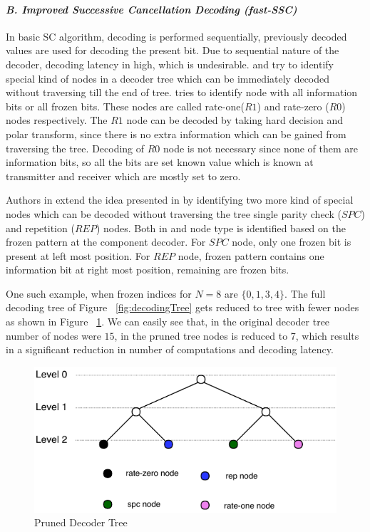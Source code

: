 
\paragraph{\emph{B. Improved Successive Cancellation Decoding (fast-SSC)}\newline}  \label{fastSSC} 
In basic SC algorithm, decoding is performed sequentially, previously decoded values are used for decoding the present bit. Due to sequential nature of the decoder, decoding latency in high, which is undesirable. \cite{SSC} and \cite{fastSSC} try to identify special kind of nodes in a decoder tree which can be immediately decoded without traversing till the end of tree. \cite{SSC} tries to identify node with all information bits or all frozen bits. These nodes are called rate-one($R1$) and rate-zero ($R0$) nodes respectively. The $R1$ node can be decoded by taking hard decision and polar transform, since there is no extra information which can be gained from traversing the tree. Decoding of $R0$ node is not necessary since none of them are information bits, so all the bits are set known value which is known at transmitter and receiver which are mostly set to zero. \par Authors in \cite{fastSSC} extend the idea presented in \cite{SSC} by identifying two more kind of special nodes which can be decoded without traversing the tree single parity check ($SPC$) and repetition ($REP$) nodes. Both in \cite{SSC} and \cite{fastSSC} node type is identified based on the frozen pattern at the component decoder. For $SPC$ node, only one frozen bit is present at left most position. For $REP$ node, frozen pattern contains one information bit at right most position, remaining are frozen bits.

One such example, when frozen indices for $N = 8$ are $\{0,1,3,4\}$. The full decoding tree of Figure ~\ref{fig:decodingTree} gets reduced to tree with fewer nodes as shown in Figure ~\ref{fig:decodingTreePruned}. We can easily see that, in the original decoder tree number of nodes were $15$, in the pruned tree nodes is reduced to 7, which results in a significant reduction in number of computations and decoding latency.

\begin{figure}[h]
	\includegraphics{./figures/decodingTreePruned.pdf}
	\caption{Pruned Decoder Tree}
	\label{fig:decodingTreePruned}
\end{figure}


